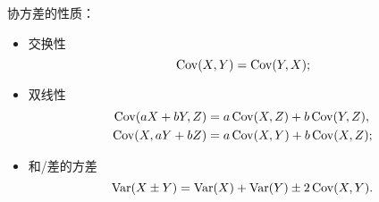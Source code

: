 \begin{corollary}
	协方差的性质：
	\begin{itemize}
		\item 交换性
		\begin{equation}
			\operatorname{Cov}(X,Y)=\operatorname{Cov}(Y,X);
		\end{equation}
		\item 双线性
		\begin{subequations}
			\begin{align}
				\operatorname{Cov}(aX+bY,Z)&=a\operatorname{Cov}(X,Z)+b\operatorname{Cov}(Y,Z),\\
				\operatorname{Cov}(X,aY+bZ)&=a\operatorname{Cov}(X,Y)+b\operatorname{Cov}(X,Z);
			\end{align}
		\end{subequations}
		\item 和/差的方差
		\begin{equation}
			\operatorname{Var}(X\pm Y)=\operatorname{Var}(X)+\operatorname{Var}(Y)\pm 2\operatorname{Cov}(X,Y).
		\end{equation}
	\end{itemize}
\end{corollary}

